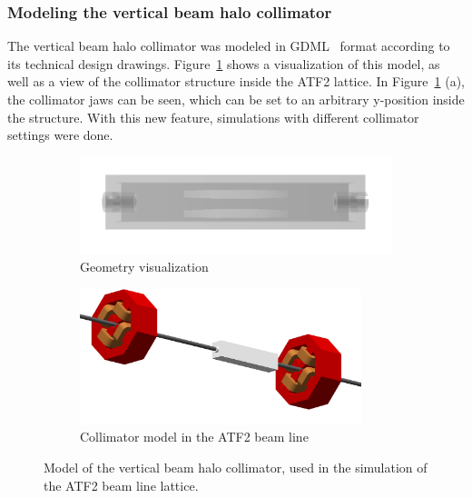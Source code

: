\subsubsection{Modeling the vertical beam halo collimator}
The vertical beam halo collimator was modeled in GDML~\cite{GDML,GDML_web} format according to its technical design drawings.
Figure~\ref{fig:Collimator_model} shows a visualization of this model, as well as a view of the collimator structure inside the ATF2 lattice.
In Figure~\ref{fig:Collimator_model} (a), the collimator jaws can be seen, which can be set to an arbitrary y-position inside the structure.
With this new feature, \bdsim simulations with different collimator settings were done.
\begin{figure}[!h]
\centering
\begin{subfigure}[b]{0.49\textwidth}
 \centering
 \includegraphics[width=\textwidth]{Figures/ATF/Collimator_model.pdf}
 \caption{Geometry visualization}
\end{subfigure}
\hfill
\begin{subfigure}[b]{0.49\textwidth}
  \centering
 \includegraphics[width=0.9\textwidth]{Figures/ATF/Collimator_in_ATF2.png}
 \caption{Collimator model in the ATF2 beam line}
\end{subfigure}
\caption[Model of the vertical beam halo collimator used in the \bdsim simulation]{Model of the vertical beam halo collimator, used in the \bdsim simulation of the ATF2 beam line lattice.
}
\label{fig:Collimator_model}
\end{figure}

